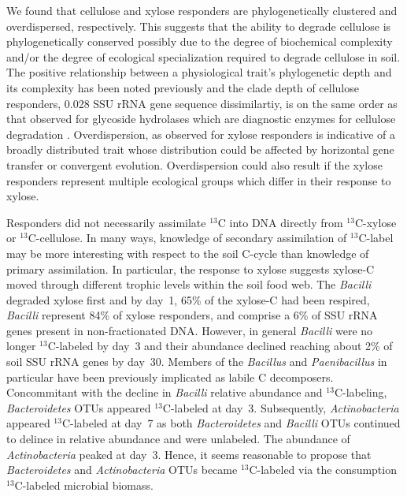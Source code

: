 We found that cellulose and xylose responders are phylogenetically clustered
and overdispersed, respectively. This suggests that the ability to degrade
cellulose is phylogenetically conserved possibly due to the degree of
biochemical complexity and/or the degree of ecological specialization required
to degrade cellulose in soil. The positive relationship between a physiological
trait’s phylogenetic depth and its complexity has been noted previously
\citep{Martiny2013} and the clade depth of cellulose responders, 0.028 SSU
rRNA gene sequence dissimilartiy, is on the same order as that observed
for glycoside hydrolases which are diagnostic enzymes for cellulose
degradation \citep{Berlemont2013}. Overdispersion, as observed for xylose
responders is indicative of a broadly distributed trait whose distribution
could be affected by horizontal gene transfer or convergent evolution.
Overdispersion could also result if the xylose responders represent multiple
ecological groups which differ in their response to xylose. 

Responders did not necessarily assimilate $^{13}$C into DNA directly
from $^{13}$C-xylose or $^{13}$C-cellulose. In many ways, knowledge of
secondary assimilation of $^{13}$C-label may be more interesting with respect
to the soil C-cycle than knowledge of primary assimilation. In particular, the
response to xylose suggests xylose-C moved through different trophic levels
within the soil food web. The \textit{Bacilli} degraded xylose first and by
day~1, 65\% of the xylose-C had been respired, \textit{Bacilli} represent 84\%
of xylose responders, and comprise a 6\% of SSU rRNA genes present in
non-fractionated DNA. However, in general \textit{Bacilli} were no
longer $^{13}$C-labeled by day~3 and their abundance declined reaching about
2\% of soil SSU rRNA genes by day~30. Members of the \textit{Bacillus}
\citep{Cleveland2007} and \textit{Paenibacillus} in particular
\citep{Verastegui_2014} have been previously implicated as labile
C decomposers. Concommitant with the decline in \textit{Bacilli} relative
abundance and $^{13}$C-labeling, \textit{Bacteroidetes} OTUs appeared
$^{13}$C-labeled at day~3. Subsequently, \textit{Actinobacteria} appeared
$^{13}$C-labeled at day~7 as both \textit{Bacteroidetes} and \textit{Bacilli}
OTUs continued to delince in relative abundance and were unlabeled. The
abundance of \textit{Actinobacteria} peaked at day~3. Hence, it seems
reasonable to propose that \textit{Bacteroidetes} and \textit{Actinobacteria}
OTUs became $^{13}$C-labeled via the consumption $^{13}$C-labeled microbial
biomass. 

